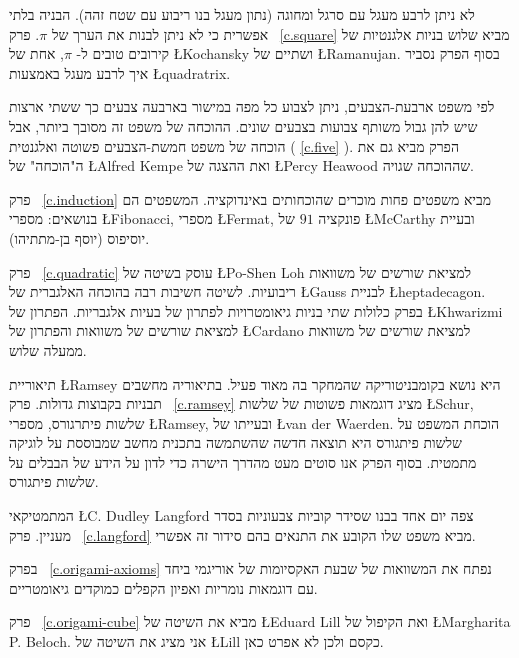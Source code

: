 לא ניתן לרבע מעגל עם סרגל ומחוגה (נתון מעגל בנו ריבוע עם שטח זהה). הבניה בלתי אפשרית כי לא ניתן לבנות את הערך של 
$\pi$.
פרק~%
\ref{c.square}
מביא שלוש בניות אלגנטיות של קירובים טובים ל-%
$\pi$,
אחת של
\L{Kochansky}
ושתיים של
\L{Ramanujan}.
בסוף הפרק נסביר איך לרבע מעגל באמצעות
\L{quadratrix}.


לפי משפט ארבעת-הצבעים, ניתן לצבוע כל מפה במישור בארבעה צבעים כך ששתי ארצות שיש להן גבול משותף צבועות בצבעים שונים. ההוכחה של משפט זה מסובך ביותר, אבל הוכחה של משפט חמשת-הצבעים פשוטה ואלגנטית (%
\ref{c.five}%
). הפרק מביא גם את ה"הוכחה" של 
\L{Alfred Kempe}
ואת ההצגה של 
\L{Percy Heawood}
שההוכחה שגויה.


פרק~%
\ref{c.induction}
מביא משפטים פחות מוכרים שהוכחותים באינדוקציה. המשפטים הם בנושאים: מספרי 
\L{Fibonacci}, 
מספרי
\L{Fermat},
פונקציה 
$91$
של 
\L{McCarthy}
ובעיית יוסיפוס (יוסף בן-מתתיהו).

פרק~%
\ref{c.quadratic}
עוסק בשיטה של
\L{Po-Shen Loh}
למציאת שורשים של משוואות ריבועיות. לשיטה חשיבות רבה בהוכחה האלגברית של
\L{Gauss}
לבניית 
\L{heptadecagon}.
בפרק כלולות שתי בניות גיאומטרויות לפתרון של בעיות אלגבריות. הפתרון של
\L{Khwarizmi}
למציאת שורשים של משוואות והפתרון של
\L{Cardano}
למציאת שורשים של משוואות ממעלה שלוש.


תיאוריית 
\L{Ramsey}
היא נושא בקומבניטוריקה שהמחקר בה מאוד פעיל. בתיאוריה מחשבים תבניות בקבוצות גדולות. פרק~%
\ref{c.ramsey}
מציג דוגמאות פשוטות של שלשות
\L{Schur},
שלשות פיתרגורס,
מספרי 
\L{Ramsey},
ובעייתו של
\L{van der Waerden}.
הוכחת המשפט על שלשות פיתגורס היא תוצאה חדשה שהשתמשה בתכנית מחשב שמבוססת על לוגיקה מתמטית. בסוף הפרק אנו סוטים מעט מהדרך הישרה כדי לדון על הידע של הבבלים על שלשות פיתגורס.

המתמטיקאי
\L{C. Dudley Langford}
צפה יום אחד בבנו שסידר קוביות צבעוניות בסדר מעניין. 
פרק~%
\ref{c.langford}
מביא משפט שלו הקובע את התנאים בהם סידור זה אפשרי.



בפרק%
~\ref{c.origami-axioms}
נפתח את המשוואות של שבעת האקסיומות של אוריגמי ביחד עם דוגמאות נומריות ואפיון הקפלים כמוקדים גיאומטריים.

פרק~%
\ref{c.origami-cube}
מביא את השיטה של
\L{Eduard Lill}
ואת הקיפול של
\L{Margharita P. Beloch}.
אני מציג את השיטה של
\L{Lill}
כקסם ולכן לא אפרט כאן.

